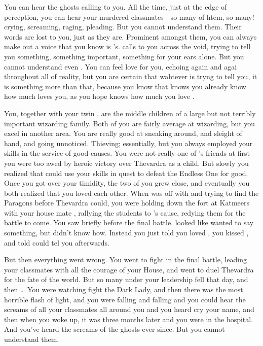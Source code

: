 \documentclass[char]{Katmeers}
\begin{document}
\name{\cGinny{}}


You can hear the ghosts calling to you. All the time, just at the edge of perception, you can hear your murdered classmates - so many of htem, so many! - crying, screaming, raging, pleading. But you cannot understand them. Their words are lost to you, just as they are. Prominent amongst them, you can always make out a voice that you know is \cHarry{}'s. \cHarry{\They} calls to you across the void, trying to tell you something, something important, something for your ears alone. But you cannot understand even \cHarry{\them}. You can feel \cHarry{\their} love for you, echoing again and agai throughout all of reality, but you are certain that wahtever \cHarry{\they} is tryng to tell you, it is something more than that, because you know that \cHarry{\they} knows you already know how much \cHarry{\they} loves you, as you hope \cHarry{\they} knows how much you love \cHarry{\them}.

You, together with your twin \cRon{\sibling} \cRon{}, are the middle children of a large but not terribly important wizarding family. Both of you are fairly average at wizarding, but you excel in another area. You are really good at sneaking around, and sleight of hand, and going unnoticed. Thieving; essentially, but you always employed your skills in the service of good causes. You were not really one of \cHarry{}'s friends at first - you were too awed by \cHarry{\their} heroic victory over Thevardra as a child. But slowly you realized that \cHarry{\they} could use your skills in \cHarry{\their} quest to defeat the Endless One for good. Once you got over your timidity, the two of you grew close, and eventually you both realized that you loved each other. When \cHarry{\they} was off with \cRon{} and \cHermione{} trying to find the Paragons before Thevardra could, you were holding down the fort at Katmeers with your house mate \cNeville{}, rallying the students to \cHarry{}'s cause, redying them for the battle to come. You saw \cHarry{} briefly before the final battle. \cHarry{} looked like \cHarry{} wanted to say something, but didn't know how. Instead you just told \cHarry{\them} you loved \cHarry{\them}, you kissed \cHarry{\them}, and told \cHarry{\them} \cHarry{\they} could tel you afterwards.

But then everything went wrong. You went to fight in the final battle, leading your classmates with all the courage of your House, and \cHarry{} went to duel Thevardra for the fate of the world. But so many under your leadership fell that day, and then \cHarry{}\ldots{} You were watching \cHarry{\them} fight the Dark Lady, and then there was the most horrible flash of light, and you were falling and falling and you could hear the screams of all your classmates all around you and you heard \cHarry{} cry your name, and then when you woke up, it was three months later and you were in the hospital. And you've heard the screams of the ghosts ever since. But you cannot understand them.
\end{document}
